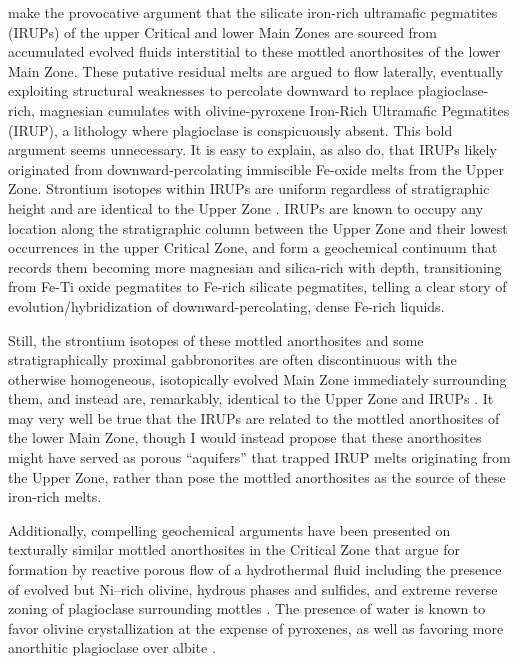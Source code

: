 \citet{scoonmitchell1994} make the provocative argument that the
silicate iron-rich ultramafic pegmatites (IRUPs) of the upper Critical
and lower Main Zones are sourced from accumulated evolved fluids
interstitial to these mottled anorthosites of the lower Main Zone. These
putative residual melts are argued to flow laterally, eventually
exploiting structural weaknesses to percolate downward to replace
plagioclase-rich, magnesian cumulates with olivine-pyroxene Iron-Rich
Ultramafic Pegmatites (IRUP), a lithology where plagioclase is
conspicuously absent. This bold argument seems unnecessary. It is easy
to explain, as \citet{scoonmitchell1994} also do, that IRUPs likely
originated from downward-percolating immiscible Fe-oxide melts from the
Upper Zone. Strontium isotopes within IRUPs are uniform regardless of
stratigraphic height and are identical to the Upper Zone \citep{scoonmitchell1994}. IRUPs are known to occupy any location along the
stratigraphic column between the Upper Zone and their lowest occurrences
in the upper Critical Zone, and form a geochemical continuum that
records them becoming more magnesian and silica-rich with depth,
transitioning from Fe-Ti oxide pegmatites to Fe-rich silicate
pegmatites, telling a clear story of evolution/hybridization of
downward-percolating, dense Fe-rich liquids.

Still, the strontium isotopes of these mottled anorthosites and some
stratigraphically proximal gabbronorites are often discontinuous with
the otherwise homogeneous, isotopically evolved Main Zone immediately
surrounding them, and instead are, remarkably, identical to the Upper
Zone and IRUPs \citep{karykowski2017,kruger1994}. It may very well
be true that the IRUPs are related to the mottled anorthosites of the
lower Main Zone, though I would instead propose that these anorthosites
might have served as porous ``aquifers'' that trapped IRUP melts
originating from the Upper Zone, rather than pose the mottled
anorthosites as the source of these iron-rich melts.

Additionally, compelling geochemical arguments have been presented on
texturally similar mottled anorthosites in the Critical Zone that argue
for formation by reactive porous flow of a hydrothermal fluid including
the presence of evolved but Ni--rich olivine, hydrous phases and
sulfides, and extreme reverse zoning of plagioclase surrounding mottles \citep[see also \S\ref{sec:ch5-origin-of-enigmatic-monomineralic-igneous-rocks}, ``'']{maier2020}. The presence of water is known to favor olivine
crystallization at the expense of pyroxenes, as well as favoring more
anorthitic plagioclase over albite \citep{baker2019}.

